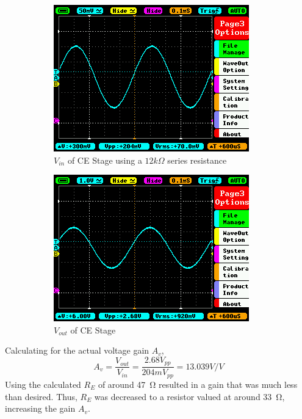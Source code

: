 \documentclass[12pt]{article}
\begin{document}
\begin{figure}[H]
\centering
    \begin{subfigure}{.45\textwidth}
      \centering
      \includegraphics[width=\linewidth]{Lab2/CE_Vin.png}  
      \caption{$V_{in}$ of CE Stage using a $12k\Omega$ series resistance}
    \end{subfigure}
    \begin{subfigure}{.45\textwidth}
      \centering
      \includegraphics[width=\linewidth]{Lab2/CE_Vout.png}  
      \caption{$V_{out}$ of CE Stage}
    \end{subfigure}
    \caption{}
\end{figure}

Calculating for the actual voltage gain $A_v$,
$$A_v = \frac{V_{out}}{V_{in}} = \frac{2.68V_{pp}}{204mV_{pp}} = 13.039V/V$$
Using the calculated $R_E$ of around \SI{47}{\ohm} resulted in a gain that was much less than desired. Thus, $R_E$ was decreased to a resistor valued at around \SI{33}{\ohm}, increasing the gain $A_v$.
\end{document}
